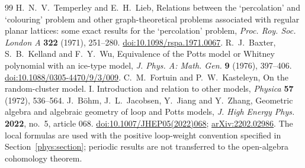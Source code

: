 \documentclass[a4paper,11pt,oneside,reqno]{amsart}
\theoremstyle{definition}
\numberwithin{equation}{section}
\begin{document}
\begin{thebibliography}{99}
H.~N.~V.~Temperley and E.~H.~Lieb,
Relations between the `percolation' and `colouring' problem and other
graph-theoretical problems associated with regular planar lattices:
some exact results for the `percolation' problem,
\emph{Proc. Roy. Soc. London A} \textbf{322} (1971), 251--280.
\href{https://doi.org/10.1098/rspa.1971.0067}{doi:10.1098/rspa.1971.0067}.
R.~J.~Baxter, S.~B.~Kelland and F.~Y.~Wu,
Equivalence of the Potts model or Whitney polynomial with an ice-type model,
\emph{J. Phys. A: Math. Gen.} \textbf{9} (1976), 397--406.
\href{https://doi.org/10.1088/0305-4470/9/3/009}{doi:10.1088/0305-4470/9/3/009}.
C.~M.~Fortuin and P.~W.~Kasteleyn,
On the random-cluster model. I. Introduction and relation to other models,
\emph{Physica} \textbf{57} (1972), 536--564.
J.~B\"ohm, J.~L.~Jacobsen, Y.~Jiang and Y.~Zhang,
Geometric algebra and algebraic geometry of loop and Potts models,
\emph{J. High Energy Phys.} \textbf{2022}, no.~5, article 068.
\href{https://doi.org/10.1007/JHEP05(2022)068}{doi:10.1007/JHEP05(2022)068};
\href{https://arxiv.org/abs/2202.02986}{arXiv:2202.02986}.
The local formulas are used with the positive loop-weight convention
specified in Section~\ref{phys:section}; periodic results are not
transferred to the open-algebra cohomology theorem.

\end{thebibliography}
	
	
\end{document}
